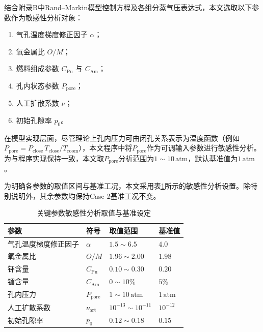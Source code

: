 结合附录B中Rand--Markin模型控制方程及各组分蒸气压表达式，本文选取以下参数作为敏感性分析对象：
\begin{enumerate}
	\item 气孔温度梯度修正因子 $\alpha$；
	\item 氧金属比 $O/M$；
	\item 燃料组成参数 $C_{\mathrm{Pu}}$ 与 $C_{\mathrm{Am}}$；
	\item 孔内状态参数 $P_{\mathrm{pore}}$；
	\item 人工扩散系数 $\nu$；
	\item 初始孔隙率 $p_0$。
\end{enumerate}

在模型实现层面，尽管理论上孔内压力可由闭孔关系表示为温度函数（例如 $P_{\mathrm{pore}}=P_{\mathrm{close}}\,T_{\mathrm{close}}/T_{\mathrm{room}}$），本文程序中将$P_{\mathrm{pore}}$作为可调输入参数进行敏感性分析。为与程序实现保持一致，本文取$P_{\mathrm{pore}}$分析范围为$1\sim10\,\mathrm{atm}$，默认基准值为$1\,\mathrm{atm}$。

为明确各参数的取值区间与基准工况，本文采用表\ref{tab:sensitivity_parameters}所示的敏感性分析设置。除特别说明外，其余参数均保持Case 2基准工况不变。

\begin{table}[htbp]
	\centering
	\caption{关键参数敏感性分析取值与基准设定}
	\label{tab:sensitivity_parameters}
	\begin{tabularx}{\textwidth}{@{}
			>{\centering\arraybackslash}X
			>{\centering\arraybackslash}m{3.8cm}
			>{\centering\arraybackslash}m{3.8cm}
			>{\centering\arraybackslash}m{3cm}
			@{}}
		\toprule
		参数 & 符号 & 取值范围 & 基准值 \\
		\midrule
		气孔温度梯度修正因子 & $\alpha$ & $1.5\sim6.5$ & $4.0$ \\
		氧金属比 & $O/M$ & $1.96\sim2.00$ & $1.98$ \\
		钚含量 & $C_{\mathrm{Pu}}$ & $0.10\sim0.30$ & $0.20$ \\
		镅含量 & $C_{\mathrm{Am}}$ & $0\sim10\%$ & $5\%$ \\
		孔内压力 & $P_{\mathrm{pore}}$ & $1\sim10\,\mathrm{atm}$ & $1\,\mathrm{atm}$ \\
		人工扩散系数 & $\nu_{\mathrm{art}}$ & $10^{-13}\sim10^{-11}$ & $10^{-12}$ \\
		初始孔隙率 & $p_0$ & $0.12\sim0.18$ & $0.15$ \\
		\bottomrule
	\end{tabularx}
\end{table}

